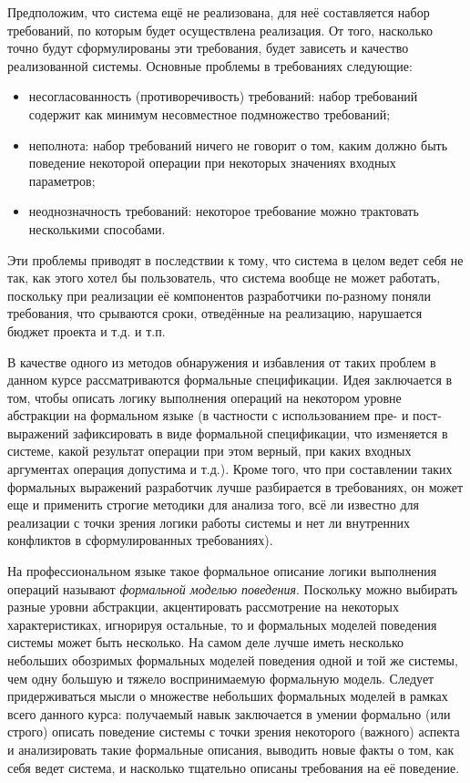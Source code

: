 \documentclass[14pt, twoside]{extreport}
\begin{document}
Предположим, что система ещё не реализована, для неё составляется набор требований, по которым будет осуществлена реализация. От того, насколько точно будут сформулированы эти требования, будет зависеть и качество реализованной системы. Основные проблемы в требованиях следующие:
\begin{itemize}
  \item несогласованность (противоречивость) требований: набор требований содержит как минимум несовместное подмножество требований;
  \item неполнота: набор требований ничего не говорит о том, каким должно быть поведение некоторой операции при некоторых значениях входных параметров;
  \item неоднозначность требований: некоторое требование можно трактовать несколькими способами.
\end{itemize}

Эти проблемы приводят в последствии к тому, что система в целом ведет себя не так, как этого хотел бы пользователь, что система вообще не может работать, поскольку при реализации её компонентов разработчики по-разному поняли требования, что срываются сроки, отведённые на реализацию, нарушается бюджет проекта и т.д. и т.п.

В качестве одного из методов обнаружения и избавления от таких проблем в данном курсе рассматриваются формальные спецификации. Идея заключается в том, чтобы описать логику выполнения операций на некотором уровне абстракции на формальном языке (в частности с использованием пре- и пост- выражений зафиксировать в виде формальной спецификации, что изменяется в системе, какой результат операции при этом верный, при каких входных аргументах операция допустима и т.д.). Кроме того, что при составлении таких формальных выражений разработчик лучше разбирается в требованиях, он может еще и применить строгие методики для анализа того, всё ли известно для реализации с точки зрения логики работы системы и нет ли внутренних конфликтов в сформулированных требованиях).

На профессиональном языке такое формальное описание логики выполнения операций называют \emph{формальной моделью поведения}. Поскольку можно выбирать разные уровни абстракции, акцентировать рассмотрение на некоторых характеристиках, игнорируя остальные, то и формальных моделей поведения системы может быть несколько. На самом деле лучше иметь несколько небольших обозримых формальных моделей поведения одной и той же системы, чем одну большую и тяжело воспринимаемую формальную модель. Следует придерживаться мысли о множестве небольших формальных моделей в рамках всего данного курса: получаемый навык заключается в умении формально (или строго) описать поведение системы с точки зрения некоторого (важного) аспекта и анализировать такие формальные описания, выводить новые факты о том, как себя ведет система, и насколько тщательно описаны требования на её поведение.
\end{document}
